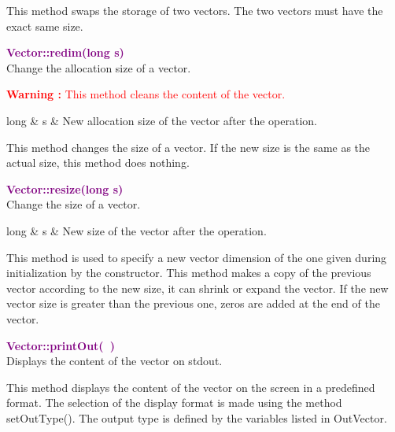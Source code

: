 This method swaps the storage of two vectors.
The two vectors must have the exact same size.

\textcolor{purple}{\textbf{Vector::redim(long s)}}\label{Vector::redim(long s)}\\
Change the allocation size of a vector.

\hspace*{10mm}\textcolor{red}{\textbf{Warning :} This method cleans the content of the vector.}

\begin{tcolorbox}[width=\textwidth,myArgs,tabularx={ll|R}]
long & s & New allocation size of the vector after the operation.
\end{tcolorbox}

This method changes the size of a vector.
If the new size is the same as the actual size, this method does nothing.

\textcolor{purple}{\textbf{Vector::resize(long s)}}\label{Vector::resize(long s)}\\
Change the size of a vector.

\begin{tcolorbox}[width=\textwidth,myArgs,tabularx={ll|R}]
long & s & New size of the vector after the operation.
\end{tcolorbox}

This method is used to specify a new vector dimension of the one given during initialization by the constructor.
This method makes a copy of the previous vector according to the new size, \ie it can shrink or expand the vector.
If the new vector size is greater than the previous one, zeros are added at the end of the vector.

\textcolor{purple}{\textbf{Vector::printOut(~)}}\label{Vector::printOut()}\\
Displays the content of the vector on stdout.

This method displays the content of the vector on the screen in a predefined format.
The selection of the display format is made using the method setOutType().
The output type is defined by the variables listed in OutVector.

